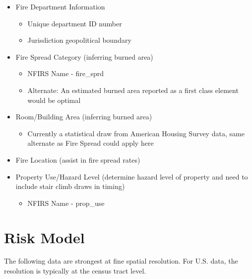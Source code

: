 \documentclass[12pt,oneside]{book}
\begin{document}
\begin{itemize}
  \item Fire Department Information
  \begin{itemize}
    \item Unique department ID number
    \item Jurisdiction geopolitical boundary
  \end{itemize}
  \item Fire Spread Category (inferring burned area)
  \begin{itemize}
    \item NFIRS Name - fire\_sprd
    \item Alternate: An estimated burned area reported as a first class element would be optimal
  \end{itemize}
  \item Room/Building Area (inferring burned area)
  \begin{itemize}
    \item Currently a statistical draw from American Housing Survey data, same alternate as Fire Spread could apply here
  \end{itemize}
  \item Fire Location (assist in fire spread rates)
  \item Property Use/Hazard Level (determine hazard level of property and need to include stair climb draws in timing)
  \begin{itemize}
    \item NFIRS Name - prop\_use
  \end{itemize}
\end{itemize}


\clearpage

\section{Risk Model}
The following data are strongest at fine spatial resolution. For U.S. data, the resolution is typically at the census tract level.
\end{document}
